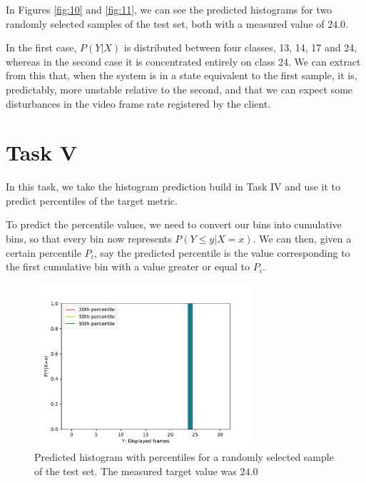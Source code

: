 \documentclass[10pt]{article}
\begin{document}
In Figures \ref{fig:10} and \ref{fig:11}, we can see the predicted histograms for two randomly selected samples of the test set, both with a measured value of $24.0$.

In the first case, $P(Y|X)$ is distributed between four classes, 13, 14, 17 and 24, whereas in the second case it is concentrated entirely on class 24. 
We can extract from this that, when the system is in a state equivalent to the first sample, it is, predictably, more unstable relative to the second, and that we can expect some disturbances in the video frame rate registered by the client.

\section*{Task V}

In this task, we take the histogram prediction build in Task IV and use it to predict percentiles of the target metric.

To predict the percentile values, we need to convert our bins into cumulative bins, so that every bin now represents $P(Y \le y|X = x)$. We can then, given a certain percentile $P_i$, say the predicted percentile is the value corresponding to the first cumulative bin with a value greater or equal to $P_i$.

\begin{figure}[h!]
    \centering
    \captionsetup{justification=centering}
    \includegraphics[width=0.72\textwidth,height=\textheight,keepaspectratio]{../result/project1/P(Y|X=x)_1192_percentiles.pdf}
    \caption{Predicted histogram with percentiles for a randomly selected sample of the test set. The measured target value was $24.0$}
    \label{fig:12}
\end{figure}
\end{document}
